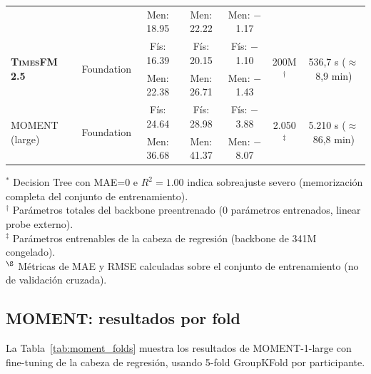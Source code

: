 \documentclass[12pt, a4paper]{article}
\newcommand{\moment}{\textsc{MOMENT}}
\newcommand{\timesfm}{\textsc{TimesFM}}
\begin{document}
\begin{table}[H]
\begin{tabular}{@{}lcccccc@{}}
& & Men: 18.95 & Men: 22.22 & Men: $-$1.17 & & \\
\multirow{2}{*}{\textbf{\timesfm{} 2.5}} & \multirow{2}{*}{Foundation} & Fís: 16.39 & Fís: 20.15 & Fís: $-$1.10 & \multirow{2}{*}{200M$^\dagger$} & \multirow{2}{*}{536,7 s ($\approx$ 8,9 min)} \\
& & Men: 22.38 & Men: 26.71 & Men: $-$1.43 & & \\
\multirow{2}{*}{\moment{} (large)} & \multirow{2}{*}{Foundation} & Fís: 24.64 & Fís: 28.98 & Fís: $-$3.88 & \multirow{2}{*}{2.050$^\ddagger$} & \multirow{2}{*}{5.210 s ($\approx$ 86,8 min)} \\
& & Men: 36.68 & Men: 41.37 & Men: $-$8.07 & & \\
\bottomrule
\end{tabular}
\begin{flushleft}
\footnotesize
$^*$ Decision Tree con MAE=0 e $R^2=1.00$ indica sobreajuste severo (memorización completa del conjunto de entrenamiento). \\
$^\dagger$ Parámetros totales del backbone preentrenado (0 parámetros entrenados, linear probe externo). \\
$^\ddagger$ Parámetros entrenables de la cabeza de regresión (backbone de 341M congelado). \\
$^\S$ Métricas de MAE y RMSE calculadas sobre el conjunto de entrenamiento (no de validación cruzada).
\end{flushleft}
\end{table}


\subsection{MOMENT: resultados por fold}

La Tabla~\ref{tab:moment_folds} muestra los resultados de \moment{}-1-large con fine-tuning de la cabeza de regresión, usando 5-fold GroupKFold por participante.
\end{document}
